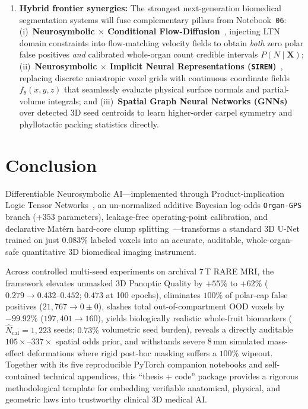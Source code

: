 \documentclass[10pt,a4paper]{article}
\renewcommand{\_}{\origunderscore\allowbreak}
\begin{document}
\begin{enumerate}
    \item \textbf{Hybrid frontier synergies:} The strongest next-generation biomedical segmentation systems will fuse complementary pillars from Notebook~\texttt{06}: (i)~\textbf{Neurosymbolic $\times$ Conditional Flow-Diffusion}~\cite{liu2023rectifiedflow,rahman2023cimd}, injecting LTN domain constraints into flow-matching velocity fields to obtain \emph{both} zero polar false positives \emph{and} calibrated whole-organ count credible intervals $P(N \mid \mathbf{X})$; (ii)~\textbf{Neurosymbolic $\times$ Implicit Neural Representations (\texttt{SIREN})}~\cite{sitzmann2020siren}, replacing discrete anisotropic voxel grids with continuous coordinate fields $f_\theta(x,y,z)$ that seamlessly evaluate physical surface normals and partial-volume integrals; and (iii)~\textbf{Spatial Graph Neural Networks (GNNs)} over detected 3D seed centroids to learn higher-order carpel symmetry and phyllotactic packing statistics directly.
\end{enumerate}

\clearpage
\section{Conclusion}
\label{sec:conclusion}

Differentiable Neurosymbolic AI---implemented through Product-implication Logic Tensor Networks~\cite{badreddine2022ltn}, an un-normalized additive Bayesian log-odds \texttt{Organ-GPS} branch ($+353$ parameters), leakage-free operating-point calibration, and declarative Mat\'ern hard-core clump splitting~\cite{matern1986spatial}---transforms a standard 3D U-Net trained on just $0.083\%$ labeled voxels into an accurate, auditable, whole-organ-safe quantitative 3D biomedical imaging instrument.

Across controlled multi-seed experiments on archival 7\,T RARE MRI, the framework elevates unmasked 3D Panoptic Quality by $+55\%$ to $+62\%$ ($0.279 \to 0.432\text{--}0.452$; $0.473$ at 100 epochs), eliminates $100\%$ of polar-cap false positives ($21{,}767 \to 0 \pm 0$), slashes total out-of-compartment OOD voxels by $-99.92\%$ ($197{,}401 \to 160$), yields biologically realistic whole-fruit biomarkers ($\hat{N}_{\text{cal}} = 1{,}223$ seeds; $0.73\%$ volumetric seed burden), reveals a directly auditable $105\times$--$337\times$ spatial odds prior, and withstands severe $8\,\text{mm}$ simulated mass-effect deformations where rigid post-hoc masking suffers a $100\%$ wipeout. Together with its five reproducible PyTorch companion notebooks and self-contained technical appendices, this ``thesis + code'' package provides a rigorous methodological template for embedding verifiable anatomical, physical, and geometric laws into trustworthy clinical 3D medical AI.
\end{document}
